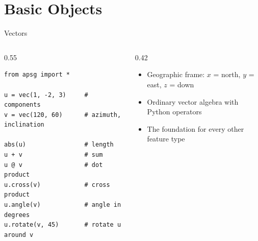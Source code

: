 \documentclass[aspectratio=169,11pt]{beamer}
\begin{document}
\section{Basic Objects}

\begin{frame}[fragile]{Vectors}
  \begin{columns}[T]
    \begin{column}{0.55\textwidth}
      \begin{lstlisting}[style=python]
from apsg import *

u = vec(1, -2, 3)     # components
v = vec(120, 60)      # azimuth, inclination

abs(u)                # length
u + v                 # sum
u @ v                 # dot product
u.cross(v)            # cross product
u.angle(v)            # angle in degrees
u.rotate(v, 45)       # rotate u around v
      \end{lstlisting}
    \end{column}
    \begin{column}{0.42\textwidth}
      \small
      \begin{itemize}
        \item Geographic frame: $x$ = north, $y$ = east, $z$ = down
        \item Ordinary vector algebra with Python operators
        \item The foundation for every other feature type
      \end{itemize}
    \end{column}
  \end{columns}
\end{frame}
\end{document}
